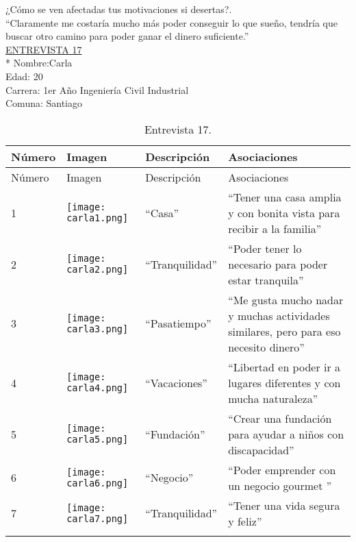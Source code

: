 ¿Cómo se ven afectadas tus motivaciones si desertas?.\\

``Claramente me costaría mucho más poder conseguir lo que sueño, tendría que buscar otro camino para poder ganar el dinero suficiente.''\\


\underline {ENTREVISTA 17}\\*
Nombre:Carla \\
Edad: 20\\
Carrera: 1er Año Ingeniería Civil Industrial\\
Comuna: Santiago\\

\begin{longtable}{>{\centering\arraybackslash}m{1cm} >{\centering\arraybackslash}m{2cm} >{\arraybackslash}m{5cm}>{\arraybackslash}m{5cm}}
	
	\hline
	Número & Imagen & Descripción & Asociaciones \\
	\hline \hline
	\endfirsthead
	
	\hline
	Número & Imagen & Descripción & Asociaciones \\
	\hline \hline
	\endhead
		
		1 & \texttt{[image: carla1.png]} & ``Casa'' & ``Tener una casa amplia y con bonita vista para recibir a la familia'' \\
		\hline
		
		2 & \texttt{[image: carla2.png]} & ``Tranquilidad'' & ``Poder tener lo necesario para poder estar tranquila'' \\
		\hline
		
		3 & \texttt{[image: carla3.png]} & ``Pasatiempo'' & ``Me gusta mucho nadar y muchas actividades similares, pero para eso necesito dinero'' \\
		\hline
		
		4 & \texttt{[image: carla4.png]} & ``Vacaciones'' & ``Libertad en poder ir a lugares diferentes y con mucha naturaleza'' \\
		\hline
		
		5 & \texttt{[image: carla5.png]} & ``Fundación'' & ``Crear una fundación para ayudar a niños con discapacidad'' \\
		\hline
		
		6 & \texttt{[image: carla6.png]} & ``Negocio'' & ``Poder emprender con un negocio gourmet '' \\
		\hline
		
		7 & \texttt{[image: carla7.png]} & ``Tranquilidad'' & ``Tener una vida segura y feliz'' \\
		\hline
		

		

	\caption{Entrevista 17.}
	\label{tabla:carla}
\end{longtable}

